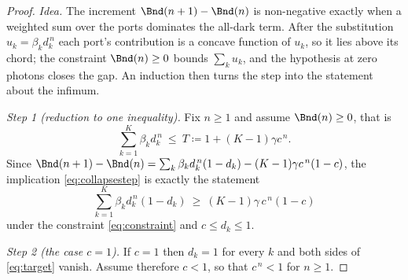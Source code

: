 \begin{proof}
\emph{Idea.} The increment $\Bnd(n+1)-\Bnd(n)$ is non-negative exactly when
a weighted sum over the ports dominates the all-dark term. After the
substitution $u_k=\beta_kd_k^{\,n}$ each port's contribution is a concave
function of $u_k$, so it lies above its chord; the constraint
$\Bnd(n)\ge0$ bounds $\sum_ku_k$, and the hypothesis at zero photons closes
the gap. An induction then turns the step into the statement about the
infimum.

\emph{Step 1 (reduction to one inequality).} Fix $n\ge1$ and assume
$\Bnd(n)\ge0$, that is
\begin{equation}\label{eq:constraint}
  \sum_{k=1}^{K}\beta_kd_k^{\,n}\ \le\ T\coloneqq1+(K-1)\gamma c^{\,n} .
\end{equation}
Since
$\Bnd(n+1)-\Bnd(n)=\sum_k\beta_kd_k^{\,n}(1-d_k)-(K-1)\gamma c^{\,n}(1-c)$,
the implication \eqref{eq:collapsestep} is exactly the statement
\begin{equation}\label{eq:target}
  \sum_{k=1}^{K}\beta_kd_k^{\,n}(1-d_k)\ \ge\ (K-1)\gamma\,c^{\,n}(1-c)
\end{equation}
under the constraint \eqref{eq:constraint} and $c\le d_k\le1$.

\emph{Step 2 (the case $c=1$).} If $c=1$ then $d_k=1$ for every $k$ and both
sides of \eqref{eq:target} vanish. Assume therefore $c<1$, so that
$c^{\,n}<1$ for $n\ge1$.


\end{proof}
